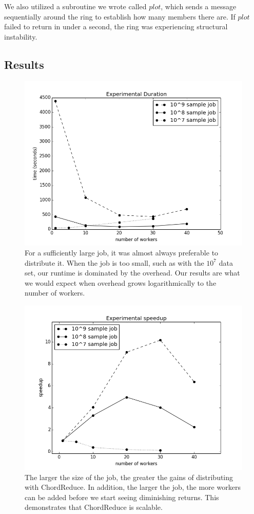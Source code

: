 \documentclass[10pt, conference, compsocconf]{IEEEtran}
\begin{document}
We also utilized a subroutine we wrote called $plot$, which sends a message sequentially around the ring to establish how many members there are.  If $plot$ failed to return in under a second, the ring was experiencing structural instability.

\subsection{Results}

\begin{figure}
    \includegraphics[width=\linewidth]{expTime}
    \caption{For a sufficiently large job, it was almost always preferable to distribute it.  When the job is too small, such as with the $10^{7}$ data set, our runtime is dominated by the overhead.  Our results are what we would expect when overhead grows logarithmically to the number of workers.}
    \label{expTime}
\end{figure}


\begin{figure}
    \includegraphics[width=\linewidth]{expSpeed}
    \caption{The larger the size of the job, the greater the gains of distributing with ChordReduce.  In addition, the larger the job, the more workers can be added before we start seeing diminishing returns.  This demonstrates that ChordReduce is scalable.}
    \label{expSpeed}
\end{figure}
\end{document}
